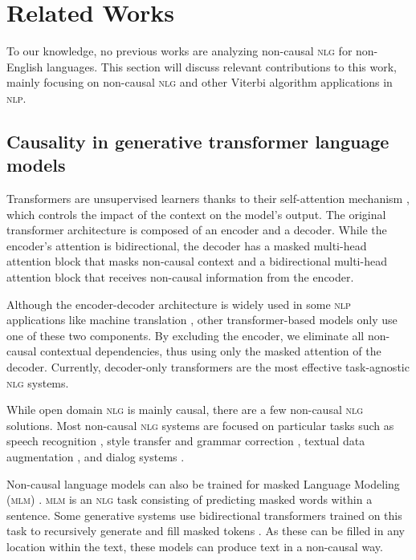 \section{Related Works}
\label{sec:related}

To our knowledge, no previous works are analyzing non-causal \textsc{nlg} for non-English languages. This section will discuss relevant contributions to this work, mainly focusing on non-causal \textsc{nlg} and other Viterbi algorithm applications in \textsc{nlp}.

\subsection{Causality in generative transformer language models}
\label{sec:noncausal_related}

Transformers are unsupervised learners thanks to their self-attention mechanism \citep{attention-2017}, which controls the impact of the context on the model's output. The original transformer architecture is composed of an encoder and a decoder. While the encoder's attention is bidirectional, the decoder has a masked multi-head attention block that masks non-causal context and a bidirectional multi-head attention block that receives non-causal information from the encoder.

Although the encoder-decoder architecture is widely used in some \textsc{nlp} applications like machine translation \citep{Kawara2021, Nguyen2021}, other transformer-based models only use one of these two components. By excluding the encoder, we eliminate all non-causal contextual dependencies, thus using only the masked attention of the decoder. Currently, decoder-only transformers are the most effective task-agnostic \textsc{nlg} systems.

While open domain \textsc{nlg} is mainly causal, there are a few non-causal \textsc{nlg} solutions. Most non-causal \textsc{nlg} systems are focused on particular tasks such as speech recognition \citep{Chen2021, Wang2022}, style transfer and grammar correction \citep{Kaneko2020}, textual data augmentation \citep{Park2019}, and dialog systems \citep{Yu2021, Wang2023}.

Non-causal language models can also be trained for masked Language Modeling (\textsc{mlm}) \citep{Zeng2021}. \textsc{mlm} is an \textsc{nlg} task consisting of predicting masked words within a sentence. Some generative systems use bidirectional transformers trained on this task to recursively generate and fill masked tokens \citep{Shen2020}. As these can be filled in any location within the text, these models can produce text in a non-causal way.

